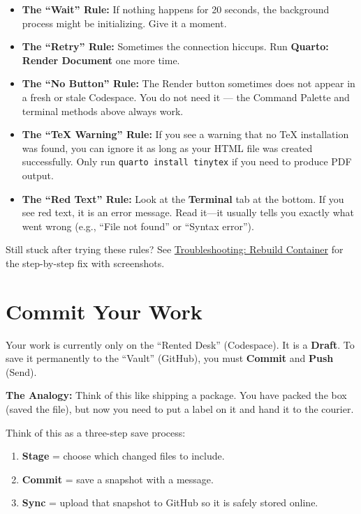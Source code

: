 \documentclass[
  letterpaper,
  DIV=11,
  numbers=noendperiod,
  oneside]{scrreprt}
\providecommand{\tightlist}{%
  \setlength{\itemsep}{0pt}\setlength{\parskip}{0pt}}
\begin{document}
\begin{itemize}
\tightlist
\item
  \textbf{The ``Wait'' Rule:} If nothing happens for 20 seconds, the
  background process might be initializing. Give it a moment.
\item
  \textbf{The ``Retry'' Rule:} Sometimes the connection hiccups. Run
  \textbf{Quarto: Render Document} one more time.
\item
  \textbf{The ``No Button'' Rule:} The Render button sometimes does not
  appear in a fresh or stale Codespace. You do not need it --- the
  Command Palette and terminal methods above always work.
\item
  \textbf{The ``TeX Warning'' Rule:} If you see a warning that no TeX
  installation was found, you can ignore it as long as your HTML file
  was created successfully. Only run \texttt{quarto\ install\ tinytex}
  if you need to produce PDF output.
\item
  \textbf{The ``Red Text'' Rule:} Look at the \textbf{Terminal} tab at
  the bottom. If you see red text, it is an error message. Read it---it
  usually tells you exactly what went wrong (e.g., ``File not found'' or
  ``Syntax error'').
\end{itemize}

Still stuck after trying these rules? See
\href{workflows09-troubleshooting.qmd}{Troubleshooting: Rebuild
Container} for the step-by-step fix with screenshots.

\chapter{Commit Your Work}\label{commit-your-work}

Your work is currently only on the ``Rented Desk'' (Codespace). It is a
\textbf{Draft}. To save it permanently to the ``Vault'' (GitHub), you
must \textbf{Commit} and \textbf{Push} (Send).

\textbf{The Analogy:} Think of this like shipping a package. You have
packed the box (saved the file), but now you need to put a label on it
and hand it to the courier.

Think of this as a three-step save process:

\begin{enumerate}
\def\labelenumi{\arabic{enumi}.}
\tightlist
\item
  \textbf{Stage} = choose which changed files to include.
\item
  \textbf{Commit} = save a snapshot with a message.
\item
  \textbf{Sync} = upload that snapshot to GitHub so it is safely stored
  online.
\end{enumerate}
\end{document}
